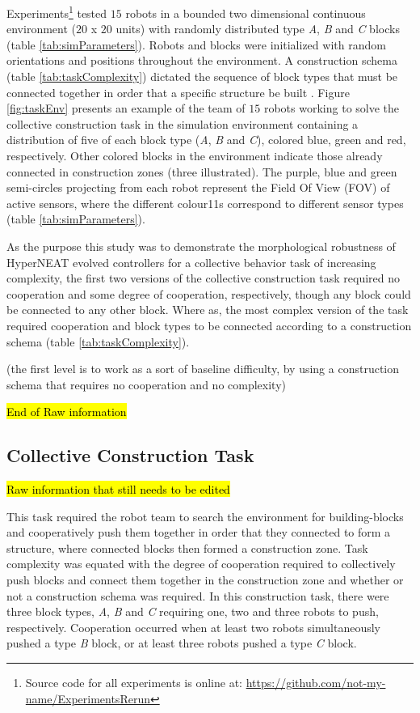 \documentclass[conference]{IEEEtran}
\begin{document}
Experiments\footnote{Source code for all experiments is online at: \url{https://github.com/not-my-name/ExperimentsRerun}}
tested $15$ robots in a bounded two dimensional continuous environment
($20$ x $20$ units) with randomly distributed type \textit{A}, \textit{B} and
\textit{C} blocks (table \ref{tab:simParameters}).
Robots and blocks were initialized with random orientations and positions throughout the environment.
A construction schema (table \ref{tab:taskComplexity}) dictated the sequence of block
types that must be connected together in order that a specific structure be built \cite{NitschkeSaEC2012}.
Figure \ref{fig:taskEnv} presents an example of the team of $15$ robots working to solve the
collective construction task in the simulation environment containing a distribution of five of each
block type (\textit{A}, \textit{B} and \textit{C}), colored blue, green and red, respectively.
Other colored blocks in the environment indicate those already connected in construction zones
(three illustrated).  The purple, blue and green semi-circles projecting from each robot
represent the Field Of View (FOV) of active sensors, where the different colour11s correspond to different
sensor types (table \ref{tab:simParameters}).

As the purpose this study was to demonstrate the morphological robustness of
HyperNEAT evolved controllers for a collective behavior task of increasing complexity,
the first two versions of the collective construction task required no cooperation and some degree of
cooperation, respectively, though any block could be connected to any other block.
Where as, the most complex version of the task required cooperation and block types
to be connected according to a construction schema (table \ref{tab:taskComplexity}).

(the first level is to work as a sort of baseline difficulty, by using a construction schema that requires no cooperation and no complexity)

\hl{End of Raw information}

\subsection{Collective Construction Task}\label{subsec:constructionTask}
\hl{Raw information that still needs to be edited}

This task required the robot team to search the environment for building-blocks and
cooperatively push them together in order that they connected to form a structure,
where connected blocks then formed a construction zone.
Task complexity was equated with the degree of cooperation required to collectively
push blocks and connect them together in the construction zone and whether or not
a construction schema was required.
In this construction task, there were three block types, \textit{A}, \textit{B} and \textit{C}
requiring one, two and three robots to push, respectively.
Cooperation occurred when at least two robots simultaneously pushed a type \textit{B} block,
or at least three robots pushed a type \textit{C} block.
\end{document}
